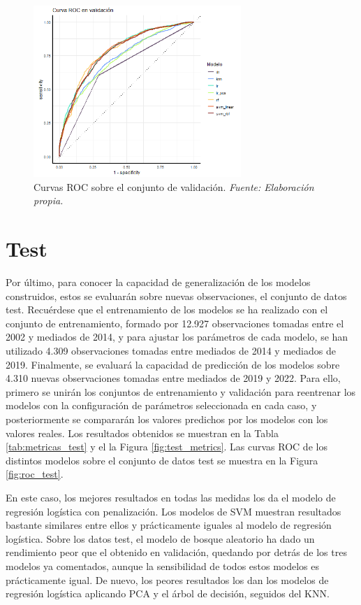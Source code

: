 \documentclass[12pt,a4paper,]{book}
\numberwithin{dummy}{section}
\theoremstyle{ocrenumbox}
\theoremstyle{blacknumex}
\theoremstyle{blacknumbox}
\theoremstyle{ocrenum}
\theoremstyle{ocrenum}
\begin{document}
\begin{figure}[h]
\centering
\includegraphics[width =0.7\textwidth]{graficos/roc_validation.png}
\caption[Curvas ROC sobre el conjunto de validación]{Curvas ROC sobre el conjunto de validación. \it Fuente: Elaboración propia.}
\label{fig:roc_validation}
\end{figure}

\hypertarget{test}{%
\section{Test}\label{test}}

Por último, para conocer la capacidad de generalización de los modelos
construidos, estos se evaluarán sobre nuevas observaciones, el conjunto
de datos test. Recuérdese que el entrenamiento de los modelos se ha
realizado con el conjunto de entrenamiento, formado por 12.927
observaciones tomadas entre el 2002 y mediados de 2014, y para ajustar
los parámetros de cada modelo, se han utilizado 4.309 observaciones
tomadas entre mediados de 2014 y mediados de 2019. Finalmente, se
evaluará la capacidad de predicción de los modelos sobre 4.310 nuevas
observaciones tomadas entre mediados de 2019 y 2022. Para ello, primero
se unirán los conjuntos de entrenamiento y validación para reentrenar
los modelos con la configuración de parámetros seleccionada en cada
caso, y posteriormente se compararán los valores predichos por los
modelos con los valores reales. Los resultados obtenidos se muestran en
la Tabla \ref{tab:metricas_test} y el la Figura \ref{fig:test_metrics}.
Las curvas ROC de los distintos modelos sobre el conjunto de datos test
se muestra en la Figura \ref{fig:roc_test}.

En este caso, los mejores resultados en todas las medidas los da el
modelo de regresión logística con penalización. Los modelos de SVM
muestran resultados bastante similares entre ellos y prácticamente
iguales al modelo de regresión logística. Sobre los datos test, el
modelo de bosque aleatorio ha dado un rendimiento peor que el obtenido
en validación, quedando por detrás de los tres modelos ya comentados,
aunque la sensibilidad de todos estos modelos es prácticamente igual. De
nuevo, los peores resultados los dan los modelos de regresión logística
aplicando PCA y el árbol de decisión, seguidos del KNN.
\end{document}
